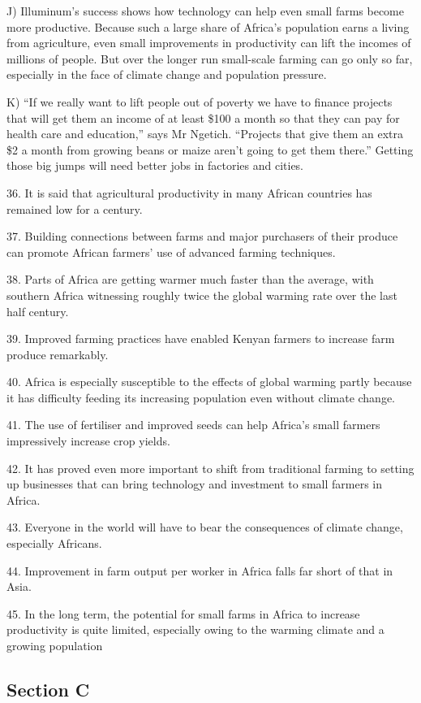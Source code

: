 \documentclass[UTF8,11pt]{ctexart}
\begin{document}
J) Illuminum’s success shows how technology can help even small farms become more productive. Because such a large share of Africa’s population earns a living from agriculture, even small improvements in productivity can lift the incomes of millions of people. But over the longer run small-scale farming can go only so far, especially in the face of climate change and population pressure.


K) “If we really want to lift people out of poverty we have to finance projects that will get them an income of at least \$100 a month so that they can pay for health care and education,” says Mr Ngetich. “Projects that give them an extra \$2 a month from growing beans or maize aren’t going to get them there.” Getting those big jumps will need better jobs in factories and cities.


36. It is said that agricultural productivity in many African countries has remained low for a century.


37. Building connections between farms and major purchasers of their produce can promote African farmers’ use of advanced farming techniques.


38. Parts of Africa are getting warmer much faster than the average, with southern Africa witnessing roughly twice the global warming rate over the last half century.


39. Improved farming practices have enabled Kenyan farmers to increase farm produce remarkably.


40. Africa is especially susceptible to the effects of global warming partly because it has difficulty feeding its increasing population even without climate change.


41. The use of fertiliser and improved seeds can help Africa’s small farmers impressively increase crop yields.


42. It has proved even more important to shift from traditional farming to setting up businesses that can bring technology and investment to small farmers in Africa.


43. Everyone in the world will have to bear the consequences of climate change, especially Africans.


44. Improvement in farm output per worker in Africa falls far short of that in Asia.


45. In the long term, the potential for small farms in Africa to increase productivity is quite limited, especially owing to the warming climate and a growing population


\subsection*{\textbf{Section C}}
\end{document}
